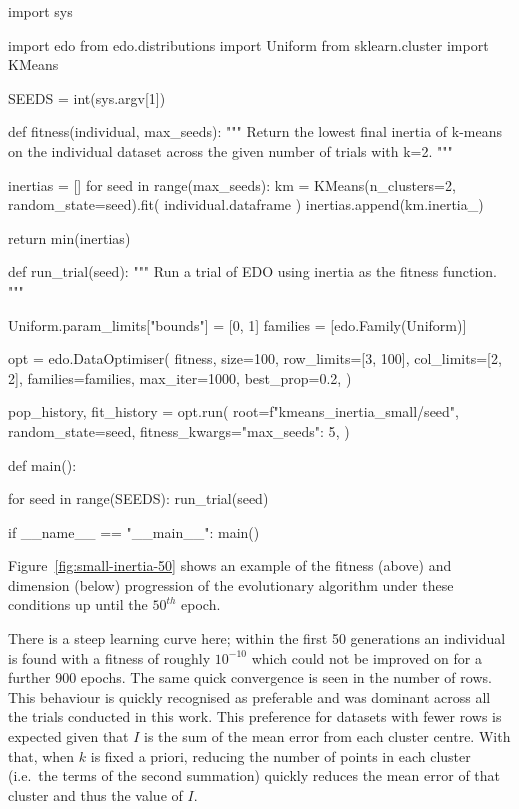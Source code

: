 \begin{listing}[htbp]
\begin{sourcepy}
import sys

import edo
from edo.distributions import Uniform
from sklearn.cluster import KMeans


SEEDS = int(sys.argv[1])


def fitness(individual, max_seeds):
    """ Return the lowest final inertia of k-means on the individual dataset
    across the given number of trials with k=2. """

    inertias = []
    for seed in range(max_seeds):
        km = KMeans(n_clusters=2, random_state=seed).fit(
            individual.dataframe
        )
        inertias.append(km.inertia_)

    return min(inertias)


def run_trial(seed):
    """ Run a trial of EDO using inertia as the fitness function. """

    Uniform.param_limits["bounds"] = [0, 1]
    families = [edo.Family(Uniform)]

    opt = edo.DataOptimiser(
        fitness,
        size=100,
        row_limits=[3, 100],
        col_limits=[2, 2],
        families=families,
        max_iter=1000,
        best_prop=0.2,
    )

    pop_history, fit_history = opt.run(
        root=f"kmeans_inertia_small/{seed}",
        random_state=seed,
        fitness_kwargs={"max_seeds": 5},
    )


def main():

    for seed in range(SEEDS):
        run_trial(seed)


if __name__ == "__main__":
    main()
\end{sourcepy}
\caption{%
    An abridged version of the source code used to produce the data from the
    first example
}\label{snp:inertia}
\end{listing}

Figure~\ref{fig:small-inertia-50} shows an example of the fitness (above) and
dimension (below) progression of the evolutionary algorithm under these
conditions up until the \(50^{th}\) epoch.

There is a steep learning curve here; within the first 50 generations an
individual is found with a fitness of roughly \(10^{-10}\) which could not be
improved on for a further 900 epochs. The same quick convergence is seen in the
number of rows. This behaviour is quickly recognised as preferable and was
dominant across all the trials conducted in this work. This preference for
datasets with fewer rows is expected given that \(I\) is the sum of the mean
error from each cluster centre. With that, when \(k\) is fixed a priori,
reducing the number of points in each cluster (i.e.\ the terms of the second
summation) quickly reduces the mean error of that cluster and thus the value of
\(I\).

